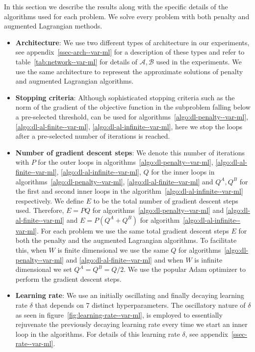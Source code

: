 In this section we describe the results along with the specific details of the algorithms used for each problem. We solve every problem with both penalty and augmented Lagrangian methods.
\begin{itemize}
    \item \textbf{Architecture}: We use two different types of architecture in our experiments, see appendix~\ref{ssec-arch--var-ml} for a description of these types and refer to table~\ref{tab:network--var-ml} for details of $\mathcal A, \mathcal B$ used in the experiments. We use the same architecture to represent the approximate solutions of penalty and augmented Lagrangian algorithms.
    \item \textbf{Stopping criteria}: Although sophisticated stopping criteria such as the norm of the gradient of the objective function in the subproblem falling below a pre-selected threshold, can be used for algorithms~\ref{algo:dl-penalty--var-ml}, \ref{algo:dl-al-finite--var-ml}, \ref{algo:dl-al-infinite--var-ml}, here we stop the loops after a pre-selected number of iterations is reached.
    \item \textbf{Number of gradient descent steps}: We denote this number of iterations with $P$ for the outer loops in algorithms~\ref{algo:dl-penalty--var-ml}, \ref{algo:dl-al-finite--var-ml}, \ref{algo:dl-al-infinite--var-ml}, $Q$ for the inner loops in algorithms~\ref{algo:dl-penalty--var-ml}, \ref{algo:dl-al-finite--var-ml} and $Q^A,Q^B$ for the first and second inner loops in the algorithm~\ref{algo:dl-al-infinite--var-ml} respectively. We define $E$ to be the total number of gradient descent steps used. Therefore, $E=PQ$ for algorithms~\ref{algo:dl-penalty--var-ml} and \ref{algo:dl-al-finite--var-ml} and $E=P(Q^A+Q^B)$ for algorithm~\ref{algo:dl-al-infinite--var-ml}. For each problem we use the same total gradient descent steps $E$ for both the penalty and the augmented Lagrangian algorithms. To facilitate this, when $W$ is finite dimensional we use the same $Q$ for algorithms~\ref{algo:dl-penalty--var-ml} and \ref{algo:dl-al-finite--var-ml} and when $W$ is infinite dimensional we set $Q^A=Q^B=Q/2$. We use the popular Adam optimizer \cite{kingma2014adam} to perform the gradient descent steps.
    \item\textbf{Learning rate}: We use an initially oscillating and finally decaying learning rate $\delta$ that depends on 7 distinct hyperparameters. The oscillatory nature of $\delta$ as seen in figure~\ref{fig:learning-rate--var-ml}, is employed to essentially rejuvenate the previously decaying learning rate every time we start  an inner loop in the algorithms. For details of this learning rate $\delta$, see appendix~\ref{ssec-rate--var-ml}. 

\end{itemize}
